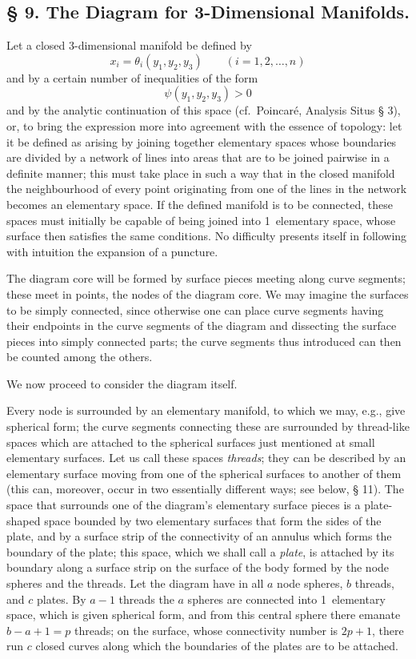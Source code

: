 \documentclass{article}
\begin{document}
\subsection*{§ 9. The Diagram for 3-Dimensional Manifolds.}

Let a closed 3-dimensional manifold be defined by
\[
x_i = \theta_i(y_1, y_2, y_3) \qquad (i = 1, 2, \dots, n)
\]
and by a certain number of inequalities of the form
\[
\psi(y_1, y_2, y_3) > 0
\]
and by the analytic continuation of this space (cf.\ Poincaré, Analysis Situs § 3), or, to bring the expression more into agreement with the essence of topology: let it be defined as arising by joining together elementary spaces whose boundaries are divided by a network of lines into areas that are to be joined pairwise in a definite manner; this must take place in such a way that in the closed manifold the neighbourhood of every point originating from one of the lines in the network becomes an elementary space. If the defined manifold is to be connected, these spaces must initially be capable of being joined into 1~elementary space, whose surface then satisfies the same conditions. No difficulty presents itself in following with intuition the expansion of a puncture.

The diagram core will be formed by surface pieces meeting along curve segments; these meet in points, the nodes of the diagram core. We may imagine the surfaces to be simply connected, since otherwise one can place curve segments having their endpoints in the curve segments of the diagram and dissecting the surface pieces into simply connected parts; the curve segments thus introduced can then be counted among the others.

We now proceed to consider the diagram itself.

Every node is surrounded by an elementary manifold, to which we may, e.g., give spherical form; the curve segments connecting these are surrounded by thread-like spaces which are attached to the spherical surfaces just mentioned at small elementary surfaces. Let us call these spaces \emph{threads}; they can be described by an elementary surface moving from one of the spherical surfaces to another of them (this can, moreover, occur in two essentially different ways; see below, § 11). The space that surrounds one of the diagram's elementary surface pieces is a plate-shaped space bounded by two elementary surfaces that form the sides of the plate, and by a surface strip of the connectivity of an annulus which forms the boundary of the plate; this space, which we shall call a \emph{plate}, is attached by its boundary along a surface strip on the surface of the body formed by the node spheres and the threads. Let the diagram have in all $a$ node spheres, $b$ threads, and $c$ plates. By $a - 1$ threads the $a$ spheres are connected into 1~elementary space, which is given spherical form, and from this central sphere there emanate $b - a + 1 = p$ threads; on the surface, whose connectivity number is $2p + 1$, there run $c$ closed curves along which the boundaries of the plates are to be attached.
\end{document}
